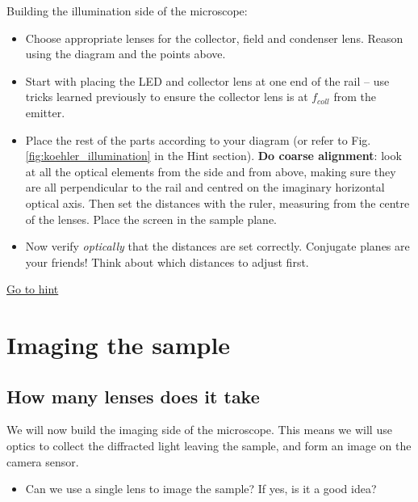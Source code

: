 \documentclass[a4paper]{report}
\begin{document}
    
    Building the illumination side of the microscope:
    \begin{itemize}
        \item Choose appropriate lenses for the collector, field and condenser lens. Reason using the diagram and the points above.
        \item Start with placing the LED and collector lens at one end of the rail -- use tricks learned previously to ensure the collector lens is at $f_{coll}$ from the emitter.
        \item Place the rest of the parts according to your diagram (or refer to Fig. \ref{fig:koehler_illumination} in the Hint section). \textbf{Do coarse alignment}: look at all the optical elements from the side and from above, making sure they are all perpendicular to the rail and centred on the imaginary horizontal optical axis. Then set the distances with the ruler, measuring from the centre of the lenses. Place the screen in the sample plane.
        \item Now verify \emph{optically} that the distances are set correctly. Conjugate planes are your friends! Think about which distances to adjust first.
    \end{itemize}
    
    \noindent
	\hyperlink{hintTo-illumination}{Go to hint}
	
	
	\section{Imaging the sample}
	\hypertarget{hintBack-imaging}{}
	
	\subsection{How many lenses does it take}
	We will now build the imaging side of the microscope. This means we will use optics to collect the diffracted light leaving the sample, and form an image on the camera sensor. 
	
	\begin{itemize}
	    \item Can we use a single lens to image the sample? If yes, is it a good idea?
	\end{itemize}
\end{document}
